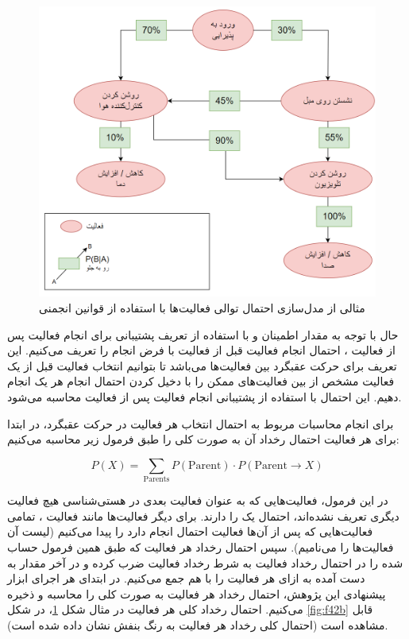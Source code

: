 \begin{figure}[htp]
\centerline{\includegraphics[width=1\textwidth]{figs/f42.png}}
\caption{مثالی از مدل‌سازی احتمال‌ توالی فعالیت‌ها با استفاده از قوانین انجمنی}
\label{fig:f42}
\end{figure}

حال با توجه به مقدار اطمینان و با استفاده از تعریف پشتیبانی برای انجام فعالیت  پس از فعالیت ، احتمال انجام فعالیت  قبل از فعالیت  با فرض انجام  را تعریف می‌کنیم. این تعریف برای حرکت عقبگرد بین فعالیت‌ها می‌باشد تا بتوانیم انتخاب فعالیت قبل از یک فعالیت مشخص از بین فعالیت‌های ممکن را با دخیل کردن احتمال انجام هر یک انجام دهیم. این احتمال با استفاده از پشتیبانی انجام فعالیت  پس از فعالیت  محاسبه می‌شود.

برای انجام محاسبات مربوط به احتمال انتخاب هر فعالیت در حرکت عقبگرد، در ابتدا برای هر فعالیت احتمال رخداد آن به صورت کلی را طبق فرمول زیر محاسبه می‌کنیم:

\begin{equation}
P(X) = \sum_{\text{Parents}} P(\text{Parent}) \cdot P(\text{Parent} \to X)
\end{equation}

در این فرمول، فعالیت‌هایی که به عنوان فعالیت بعدی در هستی‌شناسی هیچ فعالیت دیگری تعریف نشده‌اند، احتمال یک را دارند. برای دیگر فعالیت‌ها مانند فعالیت ، تمامی فعالیت‌هایی که پس از آن‌ها فعالیت  احتمال انجام دارد را پیدا می‌کنیم (لیست آن فعالیت‌ها را  می‌نامیم). سپس احتمال رخداد هر فعالیت  که طبق همین فرمول حساب شده را در احتمال رخداد فعالیت  به شرط رخداد فعالیت  ضرب کرده و در آخر مقدار به دست آمده به ازای هر فعالیت  را با هم جمع می‌کنیم. در ابتدای هر اجرای ابزار پیشنهادی این پژوهش، احتمال رخداد هر فعالیت به صورت کلی را محاسبه و ذخیره می‌کنیم. احتمال رخداد کلی هر فعالیت در مثال شکل \ref{fig:f42}، در شکل \ref{fig:f42b} قابل مشاهده است (احتمال کلی رخداد هر فعالیت به رنگ بنفش نشان داده شده است).

